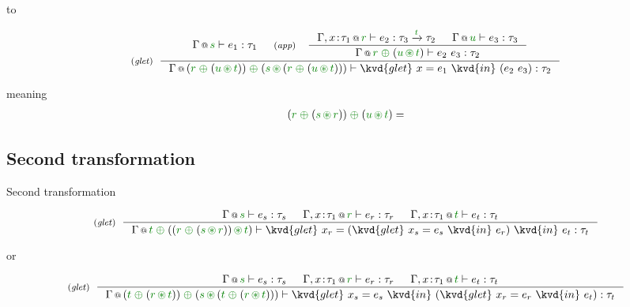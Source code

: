 to

\begin{equation*}
\tyrule{glet}
  { \coctx{\Gamma}{\cclrd{s}} \vdash e_1 : \tau_1 &
    \tyrule{app}
      { \coctx{\Gamma, x\!:\!\tau_1}{\cclrd{r}} \vdash e_2 : \tau_3 \xrightarrow{\cclrd{t}} \tau_2 & 
        \coctx{\Gamma}{\cclrd{u}} \vdash e_3 : \tau_3 }
      { \coctx{\Gamma}{\cclrd{r}\;\cpar\;(\cclrd{u}\,\cseq\,\cclrd{t})} \vdash e_2~e_3 : \tau_2 } }
  { \coctx{\Gamma}{ (\cclrd{r}\;\cpar\;(\cclrd{u}\,\cseq\,\cclrd{t})) \;\cpar\; (\cclrd{s}\,\cseq\,(\cclrd{r}\;\cpar\;(\cclrd{u}\,\cseq\,\cclrd{t})))  }
      \vdash \kvd{glet}~x=e_1~\kvd{in}~(e_2~e_3) : \tau_2 }
\end{equation*}

meaning
\begin{equation*}
\begin{array}{l}
(\cclrd{r}\;\cpar\;(\cclrd{s}\,\cseq\,\cclrd{r})) \;\cpar\; (\cclrd{u}\,\cseq\,\cclrd{t}) =
\end{array}
\end{equation*}

\subsection{Second transformation}


Second transformation

\begin{equation*}
\tyrule{glet}
  { \coctx{\Gamma}{\cclrd{s}} \vdash e_s : \tau_s &
    \coctx{\Gamma, x\!:\!\tau_1}{\cclrd{r}} \vdash e_r : \tau_r &
    \coctx{\Gamma, x\!:\!\tau_1}{\cclrd{t}} \vdash e_t : \tau_t }
  { \coctx{\Gamma}{
      \cclrd{t}
      \;\cpar\;
      (  (\cclrd{r}\;\cpar\;(\cclrd{s}\,\cseq\,\cclrd{r}))
         \,\cseq\, 
         \cclrd{t} )
    } 
    \vdash \kvd{glet}~x_r=(\kvd{glet}~x_s=e_s~\kvd{in}~e_r)~\kvd{in}~e_t : \tau_t }
\end{equation*}

or

\begin{equation*}
\tyrule{glet}
  { \coctx{\Gamma}{\cclrd{s}} \vdash e_s : \tau_s &
    \coctx{\Gamma, x\!:\!\tau_1}{\cclrd{r}} \vdash e_r : \tau_r &
    \coctx{\Gamma, x\!:\!\tau_1}{\cclrd{t}} \vdash e_t : \tau_t }
  { \coctx{\Gamma}{
      (\cclrd{t}\;\cpar\;(\cclrd{r}\,\cseq\,\cclrd{t})) 
      \;\cpar\;
      (  \cclrd{s}
         \,\cseq\, 
         (\cclrd{t}\;\cpar\;(\cclrd{r}\,\cseq\,\cclrd{t})) )
    } 
    \vdash \kvd{glet}~x_s=e_s~\kvd{in}~(\kvd{glet}~x_r=e_r~\kvd{in}~e_t) : \tau_t }
\end{equation*}


